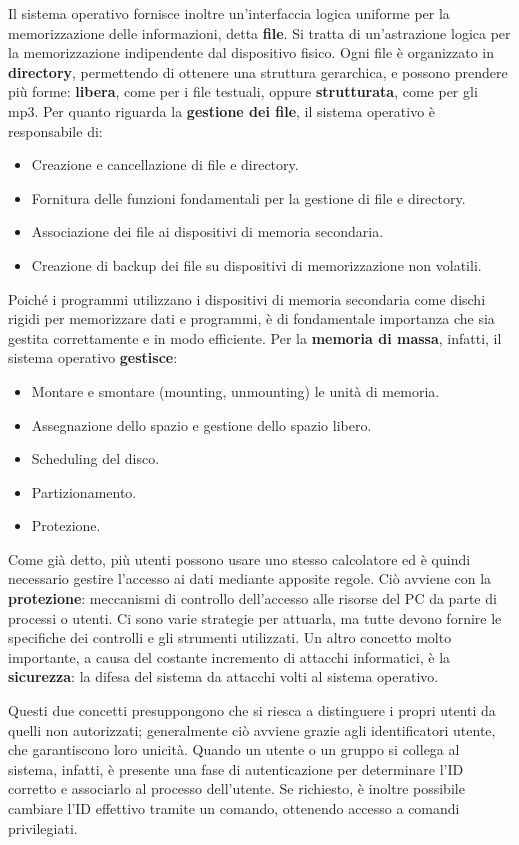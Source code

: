 \noindent Il sistema operativo fornisce inoltre un'interfaccia logica uniforme per la memorizzazione delle informazioni, detta \textbf{file}. Si tratta di un'astrazione logica per la memorizzazione indipendente dal dispositivo fisico. Ogni file è organizzato in \textbf{directory}, permettendo di ottenere una struttura gerarchica, e possono prendere più forme: \textbf{libera}, come per i file testuali, oppure \textbf{strutturata}, come per gli mp3. Per quanto riguarda la \textbf{gestione dei file}, il sistema operativo è responsabile di: \begin{itemize}
	\item Creazione e cancellazione di file e directory.
	\item Fornitura delle funzioni fondamentali per la gestione di file e directory.
	\item Associazione dei file ai dispositivi di memoria secondaria.
	\item Creazione di backup dei file su dispositivi di memorizzazione non volatili.
\end{itemize}
\noindent Poiché i programmi utilizzano i dispositivi di memoria secondaria come dischi rigidi per memorizzare dati e programmi, è di fondamentale importanza che sia gestita correttamente e in modo efficiente. Per la \textbf{memoria di massa}, infatti, il sistema operativo \textbf{gestisce}: \begin{itemize}
	\item Montare e smontare (mounting, unmounting) le unità di memoria.
	\item Assegnazione dello spazio e gestione dello spazio libero.
	\item Scheduling del disco.
	\item Partizionamento.
	\item Protezione.
\end{itemize}
\noindent Come già detto, più utenti possono usare uno stesso calcolatore ed è quindi necessario gestire l'accesso ai dati mediante apposite regole. Ciò avviene con la \textbf{protezione}: meccanismi di controllo dell'accesso alle risorse del PC da parte di processi o utenti. Ci sono varie strategie per attuarla, ma tutte devono fornire le specifiche dei controlli e gli strumenti utilizzati. Un altro concetto molto importante, a causa del costante incremento di attacchi informatici, è la \textbf{sicurezza}: la difesa del sistema da attacchi volti al sistema operativo.\par
Questi due concetti presuppongono che si riesca a distinguere i propri utenti da quelli non autorizzati; generalmente ciò avviene grazie agli identificatori utente, che garantiscono loro unicità. Quando un utente o un gruppo si collega al sistema, infatti, è presente una fase di autenticazione per determinare l'ID corretto e associarlo al processo dell'utente. Se richiesto, è inoltre possibile cambiare l'ID effettivo tramite un comando, ottenendo accesso a comandi privilegiati.\newline

